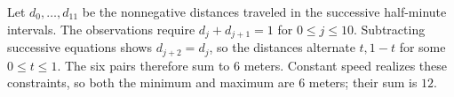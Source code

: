 Let $d_0,\ldots,d_{11}$ be the nonnegative distances traveled in the successive half-minute intervals. The observations require
$d_j+d_{j+1}=1$ for $0\le j\le10$.
Subtracting successive equations shows $d_{j+2}=d_j$, so the distances alternate $t,1-t$ for some $0\le t\le1$. The six pairs therefore sum to $6$ meters. Constant speed realizes these constraints, so both the minimum and maximum are $\boxed6$ meters; their sum is $\boxed{12}$.
